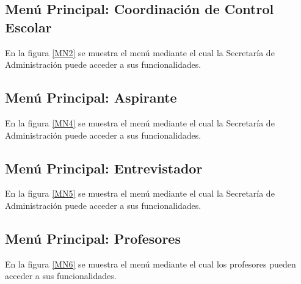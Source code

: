 \hypertarget{menu:CoordinacionControlEscolar}{}	
\subsection{Menú Principal: Coordinación de Control Escolar}
En la figura \ref{MN2} se muestra el menú mediante el cual la Secretaría de Administración puede acceder a sus funcionalidades.


\hypertarget{menu:Aspirante}{}	
\subsection{Menú Principal: Aspirante}
En la figura \ref{MN4} se muestra el menú mediante el cual la Secretaría de Administración puede acceder a sus funcionalidades.

\hypertarget{menu:Entrevistador}{}	
\subsection{Menú Principal: Entrevistador}
En la figura \ref{MN5} se muestra el menú mediante el cual la Secretaría de Administración puede acceder a sus funcionalidades.



\hypertarget{menu:Profesores}{}	
\subsection{Menú Principal: Profesores}
En la figura \ref{MN6} se muestra el menú mediante el cual los profesores pueden acceder a sus funcionalidades.


